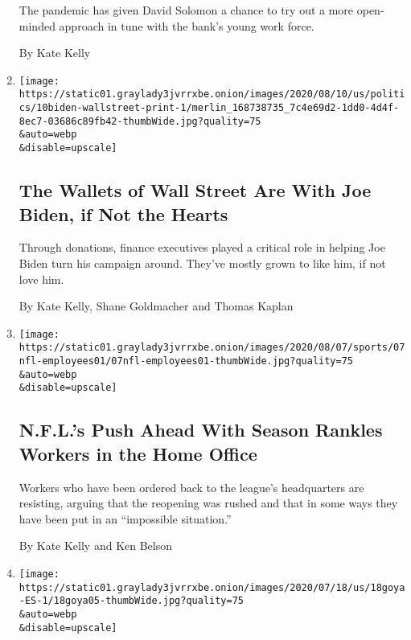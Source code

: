 \begin{enumerate}
  The pandemic has given David Solomon a chance to try out a more
  open-minded approach in tune with the bank's young work force.

  By Kate Kelly
\item
  \href{/2020/08/09/business/joe-biden-wall-street.html}{}

  \texttt{[image: https://static01.graylady3jvrrxbe.onion/images/2020/08/10/us/politics/10biden-wallstreet-print-1/merlin\_168738735\_7c4e69d2-1dd0-4d4f-8ec7-03686c89fb42-thumbWide.jpg?quality=75\\\&auto=webp\\\&disable=upscale]}

  \hypertarget{the-wallets-of-wall-street-are-with-joe-biden-if-not-the-hearts}{%
  \subsection{The Wallets of Wall Street Are With Joe Biden, if Not the
  Hearts}\label{the-wallets-of-wall-street-are-with-joe-biden-if-not-the-hearts}}

  Through donations, finance executives played a critical role in
  helping Joe Biden turn his campaign around. They've mostly grown to
  like him, if not love him.

  By Kate Kelly, Shane Goldmacher and Thomas Kaplan
\item
  \href{/2020/08/07/sports/football/coronavirus-nfl-restart-season.html}{}

  \texttt{[image: https://static01.graylady3jvrrxbe.onion/images/2020/08/07/sports/07nfl-employees01/07nfl-employees01-thumbWide.jpg?quality=75\\\&auto=webp\\\&disable=upscale]}

  \hypertarget{nfls-push-ahead-with-season-rankles-workers-in-the-home-office}{%
  \subsection{N.F.L.'s Push Ahead With Season Rankles Workers in the
  Home
  Office}\label{nfls-push-ahead-with-season-rankles-workers-in-the-home-office}}

  Workers who have been ordered back to the league's headquarters are
  resisting, arguing that the reopening was rushed and that in some ways
  they have been put in an ``impossible situation.''

  By Kate Kelly and Ken Belson
\item
  \href{/es/2020/07/19/espanol/goya-boicot-trump.html}{}

  \texttt{[image: https://static01.graylady3jvrrxbe.onion/images/2020/07/18/us/18goya-ES-1/18goya05-thumbWide.jpg?quality=75\\\&auto=webp\\\&disable=upscale]}


\end{enumerate}
